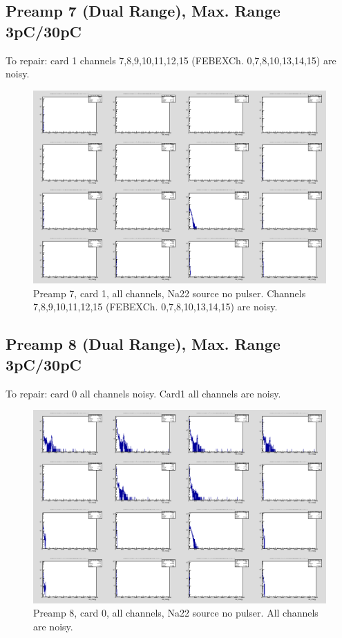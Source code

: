 \documentclass{report}
\begin{document}
\subsection{Preamp 7 (Dual Range), Max. Range 3pC/30pC}
To repair: card 1 channels 7,8,9,10,11,12,15 (FEBEXCh. 0,7,8,10,13,14,15) are noisy.
\begin{figure}[!htb]
  \includegraphics[width=\linewidth]{dr_latest_test/preamp7_lim_energy_card1_all_no_pulser.png}
  \caption{Preamp 7, card 1, all channels, Na22 source  no pulser. Channels 7,8,9,10,11,12,15 (FEBEXCh. 0,7,8,10,13,14,15) are noisy.}
\end{figure}

\newpage
\clearpage

\subsection{Preamp 8 (Dual Range), Max. Range 3pC/30pC}
To repair: card 0 all channels noisy. Card1 all channels are noisy.
\begin{figure}[!htb]
  \includegraphics[width=\linewidth]{dr_latest_test/preamp8_lim_energy_card0_all_no_pulser.png}
  \caption{Preamp 8, card 0, all channels, Na22 source  no pulser. All channels are noisy.}
\end{figure}
\end{document}
